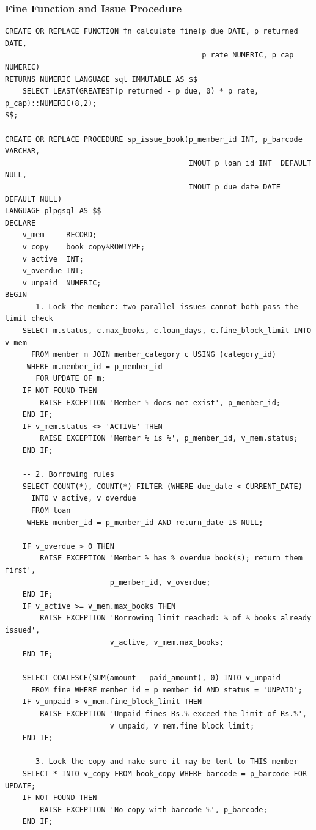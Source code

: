 \documentclass[11pt,a4paper]{report}
\begin{document}
\subsubsection{Fine Function and Issue Procedure}
\begin{lstlisting}[caption={Fine calculation and the \texttt{sp\_issue\_book} procedure}, label={lst:issue}]
CREATE OR REPLACE FUNCTION fn_calculate_fine(p_due DATE, p_returned DATE,
                                             p_rate NUMERIC, p_cap NUMERIC)
RETURNS NUMERIC LANGUAGE sql IMMUTABLE AS $$
    SELECT LEAST(GREATEST(p_returned - p_due, 0) * p_rate, p_cap)::NUMERIC(8,2);
$$;

CREATE OR REPLACE PROCEDURE sp_issue_book(p_member_id INT, p_barcode VARCHAR,
                                          INOUT p_loan_id INT  DEFAULT NULL,
                                          INOUT p_due_date DATE DEFAULT NULL)
LANGUAGE plpgsql AS $$
DECLARE
    v_mem     RECORD;
    v_copy    book_copy%ROWTYPE;
    v_active  INT;
    v_overdue INT;
    v_unpaid  NUMERIC;
BEGIN
    -- 1. Lock the member: two parallel issues cannot both pass the limit check
    SELECT m.status, c.max_books, c.loan_days, c.fine_block_limit INTO v_mem
      FROM member m JOIN member_category c USING (category_id)
     WHERE m.member_id = p_member_id
       FOR UPDATE OF m;
    IF NOT FOUND THEN
        RAISE EXCEPTION 'Member % does not exist', p_member_id;
    END IF;
    IF v_mem.status <> 'ACTIVE' THEN
        RAISE EXCEPTION 'Member % is %', p_member_id, v_mem.status;
    END IF;

    -- 2. Borrowing rules
    SELECT COUNT(*), COUNT(*) FILTER (WHERE due_date < CURRENT_DATE)
      INTO v_active, v_overdue
      FROM loan
     WHERE member_id = p_member_id AND return_date IS NULL;

    IF v_overdue > 0 THEN
        RAISE EXCEPTION 'Member % has % overdue book(s); return them first',
                        p_member_id, v_overdue;
    END IF;
    IF v_active >= v_mem.max_books THEN
        RAISE EXCEPTION 'Borrowing limit reached: % of % books already issued',
                        v_active, v_mem.max_books;
    END IF;

    SELECT COALESCE(SUM(amount - paid_amount), 0) INTO v_unpaid
      FROM fine WHERE member_id = p_member_id AND status = 'UNPAID';
    IF v_unpaid > v_mem.fine_block_limit THEN
        RAISE EXCEPTION 'Unpaid fines Rs.% exceed the limit of Rs.%',
                        v_unpaid, v_mem.fine_block_limit;
    END IF;

    -- 3. Lock the copy and make sure it may be lent to THIS member
    SELECT * INTO v_copy FROM book_copy WHERE barcode = p_barcode FOR UPDATE;
    IF NOT FOUND THEN
        RAISE EXCEPTION 'No copy with barcode %', p_barcode;
    END IF;


\end{lstlisting}
\end{document}
